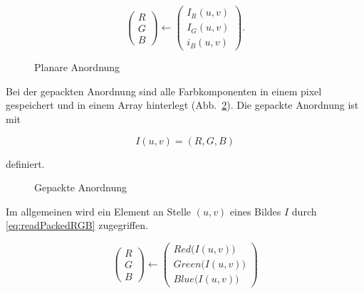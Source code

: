 \begin{equation}
	\begin{pmatrix}
		R\\
		G\\
		B
	\end{pmatrix}
	\leftarrow
	\begin{pmatrix}
		I_R\left(u,v\right)\\
		I_G\left(u,v\right)\\
		i_B\left(u,v\right)
	\end{pmatrix}.
	\label{eq:readPlanarImage}
\end{equation}

\begin{figure}[!ht]
	\centering
	\def\svgwidth{.5\columnwidth}
	
	\caption{Planare Anordnung}
	\label{fig:planareAnordnung}
\end{figure}

Bei der gepackten Anordnung sind alle Farbkomponenten in einem \gls{pixel} gespeichert und in einem Array hinterlegt (Abb.~\ref{fig:gepackteAnordnung}). Die gepackte Anordnung ist mit

\begin{equation}
	I\left(u,v\right) = \left(R,G,B\right)
	\label{eq:packedImage}
\end{equation}

definiert.

\begin{figure}[!ht]
	\centering
	\def\svgwidth{.5\columnwidth}
	
	\caption{Gepackte Anordnung}
	\label{fig:gepackteAnordnung}
\end{figure}

Im allgemeinen wird ein Element an Stelle $(u,v)$ eines Bildes $I$ durch \eqref{eq:readPackedRGB} zugegriffen.

\begin{equation}
	\begin{pmatrix}
		R\\
		G\\
		B
	\end{pmatrix}
	\leftarrow
	\begin{pmatrix}
		Red\bigl(I\left(u,v\right)\bigr)\\
		Green\bigl(I\left(u,v\right)\bigr)\\
		Blue\bigl(I\left(u,v\right)\bigr)
	\end{pmatrix}
	\label{eq:readPackedRGB}
\end{equation}

